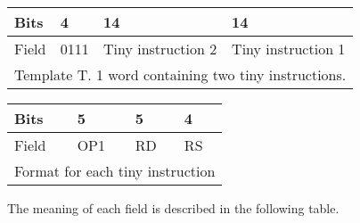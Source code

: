 \documentclass[forwardcom.tex]{subfiles}
\begin{document}
\begin{longtable}[l]{|p{7mm}|p{7mm}|p{40mm}|p{40mm}|}
\endfirsthead
\label{table:templateT}
\endhead
\hline
 Bits & 4 & \hspace{16mm} 14 & \hspace{16mm} 14 \\
\hline
Field & 0111 & \hspace{5mm} Tiny instruction 2 & \hspace{5mm} Tiny instruction 1 \\
\hline
\multicolumn{4}{|p{108mm}|}{
Template T. 1 word containing two tiny instructions.} \\
\hline
\end{longtable}

\begin{longtable}[l]{|p{10mm}|p{15mm}|p{15mm}|p{15mm}|}
\endfirsthead
\label{table:tinyFormat}
\endhead
\hline
Bits & 5 & 5 & 4 \\
\hline
Field & OP1 & RD & RS \\
\hline
\multicolumn{4}{|l|}{
Format for each tiny instruction } \\
\hline
\end{longtable}
\vspace{2mm}


The meaning of each field is described in the following table.
\end{document}
